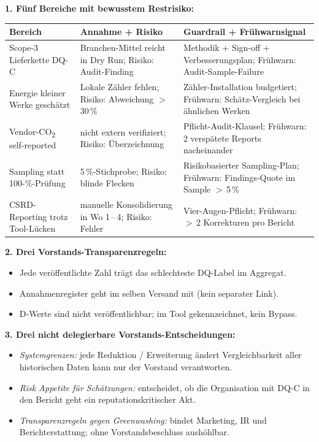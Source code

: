 \documentclass[11pt,a4paper,oneside]{article}
\begin{document}
\begin{loesungbox}
\textbf{1. F\"unf Bereiche mit bewusstem Restrisiko:}

\smallskip
\begin{tabularx}{\linewidth}{@{}p{3.0cm}XX@{}}
\toprule
\textbf{Bereich} & \textbf{Annahme + Risiko} & \textbf{Guardrail + Fr\"uhwarnsignal} \\
\midrule
Scope-3 Lieferkette DQ-C    & Branchen-Mittel reicht in Dry Run; Risiko: Audit-Finding & Methodik + Sign-off + Verbesserungsplan; Fr\"uhwarn: Audit-Sample-Failure \\
Energie kleiner Werke gesch\"atzt & Lokale Z\"ahler fehlen; Risiko: Abweichung $>$\,30\,\% & Z\"ahler-Installation budgetiert; Fr\"uhwarn: Sch\"atz-Vergleich bei \"ahnlichen Werken \\
Vendor-CO\textsubscript{2} self-reported & nicht extern verifiziert; Risiko: \"Uberzeichnung & Pflicht-Audit-Klausel; Fr\"uhwarn: 2 versp\"atete Reports nacheinander \\
Sampling statt 100-\%-Pr\"ufung & 5\,\%-Stichprobe; Risiko: blinde Flecken & Risikobasierter Sampling-Plan; Fr\"uhwarn: Findings-Quote im Sample $>$\,5\,\% \\
CSRD-Reporting trotz Tool-L\"ucken & manuelle Konsolidierung in Wo 1\,--\,4; Risiko: Fehler & Vier-Augen-Pflicht; Fr\"uhwarn: $>$\,2 Korrekturen pro Bericht \\
\bottomrule
\end{tabularx}

\smallskip
\textbf{2. Drei Vorstands-Transparenzregeln:}
\begin{itemize}
  \item Jede ver\"offentlichte Zahl tr\"agt das schlechteste DQ-Label im Aggregat.
  \item Annahmenregister geht im selben Versand mit (kein separater Link).
  \item D-Werte sind nicht ver\"offentlichbar; im Tool gekennzeichnet, kein Bypass.
\end{itemize}

\smallskip
\textbf{3. Drei nicht delegierbare Vorstands-Entscheidungen:}
\begin{itemize}
  \item \emph{Systemgrenzen:} jede Reduktion / Erweiterung \"andert Vergleichbarkeit aller historischen Daten \textendash{} kann nur der Vorstand verantworten.
  \item \emph{Risk Appetite f\"ur Sch\"atzungen:} entscheidet, ob die Organisation mit DQ-C in den Bericht geht \textendash{} ein reputationskritischer Akt.
  \item \emph{Transparenzregeln gegen Greenwashing:} bindet Marketing, IR und Berichterstattung; ohne Vorstandsbeschluss aush\"ohlbar.
\end{itemize}


\end{loesungbox}
\end{document}
